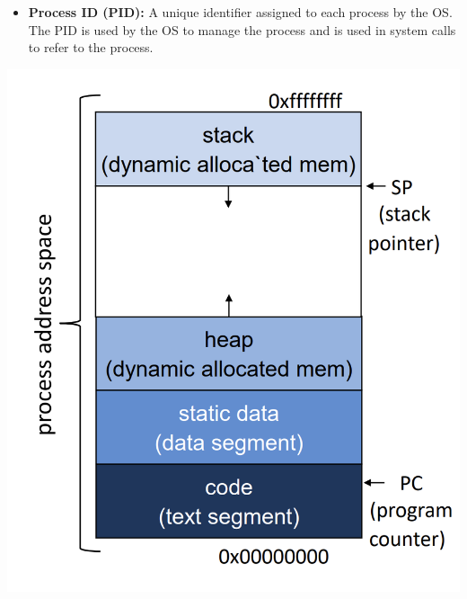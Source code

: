 \documentclass[openany,12pt]{book}
\begin{document}
\begin{center}
\begin{minipage}[t]{0.6\textwidth}
\begin{itemize}
            \item \textbf{Process ID (PID):} A unique identifier assigned to each process by the OS. The PID is used by the OS to manage the process and is used in system calls to refer to the process.
        \end{itemize}
    \end{minipage}%
    \hspace{1em}
    \begin{minipage}[t]{0.35\textwidth}
        \vspace{0pt} %
        \centering
        \includegraphics[width=\linewidth]{../Assets/process_memory.png}
    \end{minipage}
\end{center}
\end{document}
